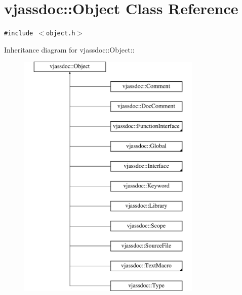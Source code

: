 \hypertarget{classvjassdoc_1_1Object}{
\section{vjassdoc::Object Class Reference}
\label{classvjassdoc_1_1Object}
}
{\tt \#include $<$object.h$>$}

Inheritance diagram for vjassdoc::Object::\begin{figure}[H]
\begin{center}
\leavevmode
\includegraphics[height=12cm]{classvjassdoc_1_1Object}
\end{center}
\end{figure}
